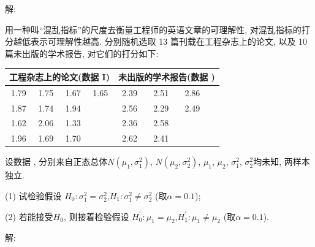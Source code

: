 \documentclass[standard]{ExBook}
\begin{document}
\begin{qitems}
\vspace{-5em}

    \begin{bbox}
解: 
    \end{bbox}

\vspace{-5em}

    \begin{bbox}
    \begin{shaded}
        \qitem
用一种叫``混乱指标''的尺度去衡量工程师的英语文章的可理解性, 对混乱指标的打分越低表示可理解性越高. 分别随机选取 13 篇刊载在工程杂志上的论文, 以及 10 篇未出版的学术报告, 对它们的打分如下:
\begin{center}
\setlength{\tabcolsep}{21pt}
\begin{tabular}{cccc|cccc}
\hline
\multicolumn{4}{c|}{工程杂志上的论文(数据 I)} & \multicolumn{4}{c}{未出版的学术报告(数据 \uppercase\expandafter{\romannumeral2})} \\
\hline
1.79 & 1.75 & 1.67 & 1.65 & 2.39 & 2.51 & 2.86 &  \\
1.87 & 1.74 & 1.94 &  & 2.56 & 2.29 & 2.49\\
1.62 & 2.06 & 1.33 &  & 2.36 & 2.58 &  &  \\
1.96 & 1.69 & 1.70 &  & 2.62 & 2.41 &  &  \\
\hline
\end{tabular}
\end{center}
设数据 \uppercase\expandafter{}, \uppercase\expandafter{} 分别来自正态总体$N(\mu_1,\sigma_1^2)$, $N(\mu_2,\sigma_2^2)$, $\mu_1$, $\mu_2$, $\sigma_1^2$, $\sigma_2^2$均未知, 两样本独立.

(1) 试检验假设 $H_0 : \sigma_1^2=\sigma_2^2$,\quad $H_1 : \sigma_1^2 \neq \sigma_2^2$ (取$\alpha=0.1$);

(2) 若能接受$H_0$, 则接着检验假设 $H_0^{'} : \mu_1=\mu_2$,\quad $H_1^{'} : \mu_1 \neq \mu_2$ (取$\alpha=0.1$).
    \end{shaded}
    \end{bbox}

\vspace{-5em}

    \begin{bbox}
解: 
    \end{bbox}

\vspace{-5em}


\end{qitems}
\end{document}
